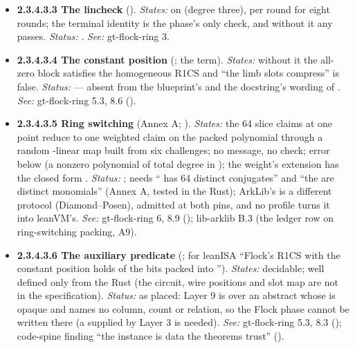 \begin{itemize}[label={}, leftmargin=1.3em, itemindent=-1.3em, labelwidth=0pt, labelsep=0pt, itemsep=4pt, topsep=3pt]
\begin{itemize}[label={}, leftmargin=1.3em, itemindent=-1.3em, labelwidth=0pt, labelsep=0pt, itemsep=4pt, topsep=3pt]
\item {}\label{obl:node-2.3.4.3.3}\textbf{2.3.4.3.3 The lincheck} (). \emph{States:}  on  (degree three),  per round for eight rounds; the terminal identity is the phase's only check, and without it any  passes. \emph{Status:} . \emph{See:} gt-flock-ring 3.
\item {}\label{obl:node-2.3.4.3.4}\oblflag\textbf{2.3.4.3.4 The constant position} (; the  term). \emph{States:} without it the all-zero block satisfies the homogeneous R1CS and ``the limb slots compress'' is false. \emph{Status:}   — absent from the blueprint's and the docstring's wording of . \emph{See:} gt-flock-ring 5.3, 8.6 ().
\item {}\label{obl:node-2.3.4.3.5}\textbf{2.3.4.3.5 Ring switching} (Annex A; ). \emph{States:} the 64 slice claims at one point reduce to one weighted claim on the packed polynomial through a random -linear map built from six challenges; no message, no check; error below  (a nonzero polynomial of total degree  in ); the weight's extension has the closed form . \emph{Status:} ; needs `` has 64 distinct conjugates'' and ``the  are distinct monomials'' (Annex A, tested in the Rust); ArkLib's  is a different protocol (Diamond–Posen), admitted at both pins, and no profile turns it into leanVM's. \emph{See:} gt-flock-ring 6, 8.9 (); lib-arklib B.3 (the ledger row on ring-switching packing, A9).
\item {}\label{obl:node-2.3.4.3.6}\oblflag\textbf{2.3.4.3.6 The auxiliary predicate} (; for leanISA ``Flock's R1CS with the constant position holds of the bits packed into ''). \emph{States:} decidable; well defined only from the Rust (the circuit, wire positions and slot map are not in the specification). \emph{Status:}   as placed: Layer 9 is over an abstract  whose  is opaque and names no column, count or relation, so the Flock phase cannot be written there (a  supplied by Layer 3 is needed). \emph{See:} gt-flock-ring 5.3, 8.3 (); code-spine finding ``the instance is data the theorems trust'' ().

\end{itemize}
\end{itemize}
